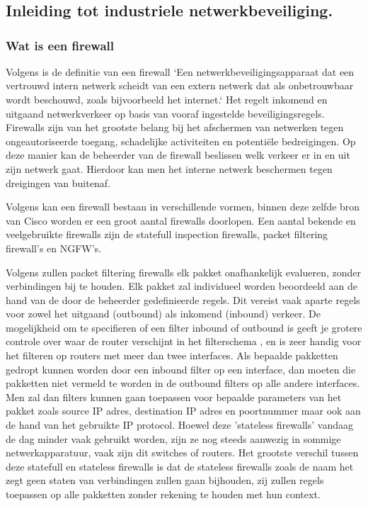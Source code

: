 \chapter{}%
\label{ch:stand-van-zaken}

\section{Inleiding tot industriele netwerkbeveiliging.}

\subsection{Wat is een firewall}
Volgens \textcite{ciscoFW2025} is de definitie van een firewall `Een netwerkbeveiligingsapparaat dat een vertrouwd intern netwerk scheidt van een extern netwerk dat als onbetrouwbaar wordt beschouwd, zoals bijvoorbeeld het internet.` Het regelt inkomend en uitgaand netwerkverkeer op basis van vooraf ingestelde beveiligingsregels. Firewalls zijn van het grootste belang bij het afschermen van netwerken tegen ongeautoriseerde toegang, schadelijke activiteiten en potentiële bedreigingen.
Op deze manier kan de beheerder van de firewall beslissen welk verkeer er in en uit zijn netwerk gaat. Hierdoor kan men het interne netwerk beschermen tegen dreigingen van buitenaf.


Volgens \textcite{ciscoFW2025} kan een firewall bestaan in verschillende vormen, binnen deze zelfde bron van Cisco worden er een groot aantal firewalls doorlopen. Een aantal bekende en veelgebruikte firewalls zijn de statefull inspection firewalls, packet filtering firewall's  en NGFW's.
 
Volgens \textcite{goel2014} zullen packet filtering firewalls elk pakket onafhankelijk evalueren, zonder verbindingen bij te houden. Elk pakket zal individueel worden beoordeeld aan de hand van de door de beheerder gedefinieerde regels. Dit vereist vaak aparte regels voor zowel het uitgaand (outbound) als inkomend (inbound) verkeer. De mogelijkheid om te specifieren of een filter inbound of outbound is geeft je grotere controle over waar de router verschijnt in het filterschema , en is zeer handig voor het filteren op routers met meer dan twee interfaces. Als bepaalde pakketten gedropt kunnen worden door een inbound filter op een interface, dan moeten die pakketten niet vermeld te worden in de outbound filters op alle andere interfaces. Men zal dan filters kunnen gaan toepassen voor bepaalde parameters van het pakket zoals source IP adres, destination IP adres en poortnummer maar ook aan de hand van het gebruikte IP protocol. Hoewel deze 'stateless firewalls' vandaag de dag minder vaak gebruikt worden, zijn ze nog steeds aanwezig in sommige netwerkapparatuur, vaak zijn dit switches of routers. Het grootste verschil tussen deze statefull en stateless firewalls is dat de stateless firewalls zoals de naam het zegt geen staten van verbindingen zullen gaan bijhouden, zij zullen regels toepassen op alle pakketten zonder rekening te houden met hun context. \autocite{goel2014}

